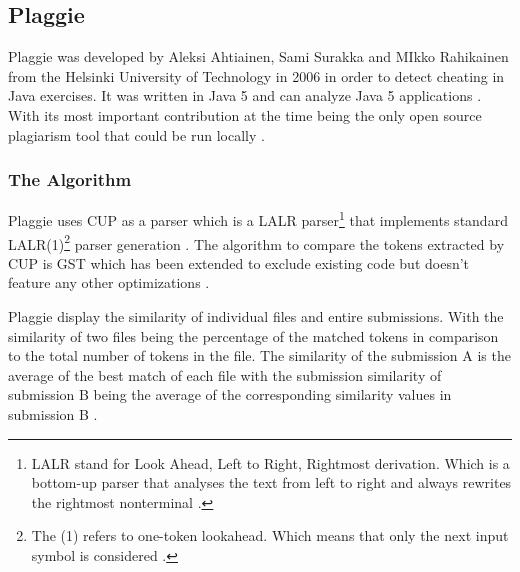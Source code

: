 \documentclass[a4paper, 11pt]{article}
\renewcommand{\\}{\vspace*{0.5\baselineskip} \newline}
\begin{document}



\subsection{Plaggie}

Plaggie was developed by Aleksi Ahtiainen, Sami Surakka and MIkko Rahikainen from the Helsinki University of Technology in 2006 in order to detect cheating in
Java exercises. It was written in Java 5 and can analyze Java 5 applications \autocite[3. Current list of features]{RMP}. With its most important
contribution at the time being the only open source plagiarism tool that could be run locally \autocite[p. 141]{PLAGGIE}.

\subsubsection{The Algorithm}

Plaggie uses CUP as a parser which is a LALR parser\footnote{LALR stand for Look Ahead, Left to Right, Rightmost derivation. Which is a bottom-up parser that analyses the text from left to right and always rewrites the rightmost nonterminal \autocite{ICD}.}
that implements standard LALR(1)\footnote{The (1) refers to one-token lookahead. Which means that only the next input symbol is considered \autocite{ICD}.} parser generation \autocite{CUP}. The algorithm to compare
the tokens extracted by CUP is GST which has been extended to exclude existing code but doesn't feature any other optimizations \autocite[4. Algorithm used]{RMP}.

Plaggie display the similarity of individual files and entire submissions. With the similarity of two files being the percentage of the matched tokens
in comparison to the total number of tokens in the file. The similarity of the submission A is the average of the best match of each file with the
submission similarity of submission B being the average of the corresponding similarity values in submission B \autocite*[4. Algorithm used]{RMP}. 
\end{document}

